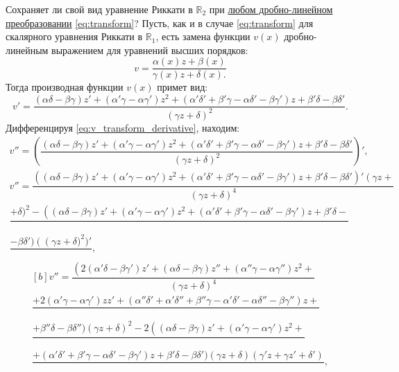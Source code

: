  Сохраняет ли свой вид уравнение Риккати в $\mathbb{R}_2$ при \hyperlink{sec_prop}{любом дробно-линейном преобразовании} \eqref{eq:transform}? Пусть, как и в случае \eqref{eq:transform} для скалярного уравнения Риккати в $\mathbb{R}_1$, есть замена функции $v(x)$ дробно-линейным выражением для уравнений высших порядков:
 \begin{equation}  \label{eq:v_transform}
    v = \dfrac{\alpha \left( x \right) z + \beta \left( x \right)}{\gamma \left( x \right) z + \delta \left( x \right).}
\end{equation}
Тогда производная функции $v(x)$ примет вид:
\begin{equation}  \label{eq:v_transform_derivative}
    v' = \dfrac{\left( \alpha \delta - \beta \gamma \right)z' + \left( \alpha' \gamma - \alpha \gamma' \right)z^{2} + \left( \alpha' \delta' + \beta' \gamma - \alpha \delta' - \beta \gamma' \right)z + \beta' \delta - \beta \delta'}{\left( \gamma z + \delta \right)^2}.
\end{equation}
 Дифференцируя \eqref{eq:v_transform_derivative}, находим:
\begin{multline*}
    v'' = \left( \dfrac{\left( \alpha \delta - \beta \gamma \right)z' + \left( \alpha' \gamma - \alpha \gamma' \right)z^{2} + \left( \alpha' \delta' + \beta' \gamma - \alpha \delta' - \beta \gamma' \right)z + \beta' \delta - \beta \delta'}{\left( \gamma z + \delta \right)^2} \right)',\\
    v'' = \dfrac{\left( (\alpha \delta - \beta \gamma)z' + (\alpha' \gamma - \alpha \gamma')z^{2} + ( \alpha' \delta' + \beta' \gamma - \alpha \delta' - \beta \gamma')z + \beta' \delta - \beta \delta' \right)' \left( \gamma z + \right.}{\left( \gamma z + \delta \right)^4} \\ \dfrac{+ \delta \big)^2 - \left( (\alpha \delta - \beta \gamma)z' + (\alpha' \gamma - \alpha \gamma')z^{2} + ( \alpha' \delta' + \beta' \gamma - \alpha \delta' - \beta \gamma')z + \beta' \delta - \right.}{} \\ \dfrac{- \beta \delta' \big) \left( \left( \gamma z + \right. \right. \delta \big)^2 \big)'}{},
\end{multline*}
\begin{equation}
\begin{aligned}[b]
    v'' = \dfrac{\left( \right. 2 \left( \alpha' \delta - \beta \gamma' \right)z' + \left( \alpha \delta - \beta \gamma \right)z'' + \left( \alpha'' \gamma - \alpha \gamma''\right)z^{2} + }{\left( \gamma z + \delta \right)^4} \\ \dfrac{+ 2 \left( \alpha' \gamma - \alpha \gamma'\right)z z' + \left( \alpha'' \delta' + \alpha' \delta'' + \beta'' \gamma - \alpha' \delta' -\alpha \delta'' - \beta \gamma'' \right)z + }{} \\ \dfrac{ + \beta'' \delta -\beta \delta'' \big) (\gamma z + \delta)^2 - 2\left( (\alpha \delta - \beta \gamma)z' + (\alpha' \gamma - \alpha \gamma')z^{2} + \right.}{} \\ \dfrac{+ ( \alpha' \delta' + \beta' \gamma - \alpha \delta' - \beta \gamma')z + \beta' \delta  - \beta \delta' \big) \left( \gamma z +  \delta \right) \left( \gamma' z + \gamma z' +  \delta' \right)}{},
\end{aligned}  
\label{eq:v_sec_transform_derivative}
\end{equation}
